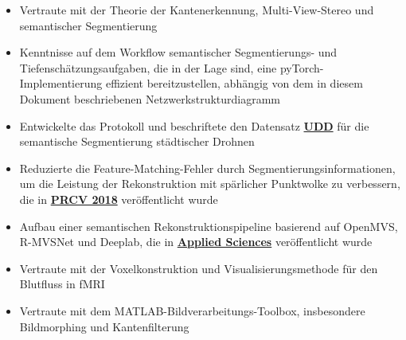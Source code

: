 \documentclass{resume}
\begin{document}
\begin{itemize}
    \item Vertraute mit der Theorie der Kantenerkennung, Multi-View-Stereo und semantischer Segmentierung
    \item Kenntnisse auf dem Workflow semantischer Segmentierungs- und Tiefenschätzungsaufgaben, die in der Lage sind, eine pyTorch-Implementierung effizient bereitzustellen, abhängig von dem in diesem Dokument beschriebenen Netzwerkstrukturdiagramm
	\item Entwickelte das Protokoll und beschriftete den Datensatz \href{https://mrright.wang/UDD/}{\textbf{UDD}} für die semantische Segmentierung städtischer Drohnen
	\item Reduzierte die Feature-Matching-Fehler durch Segmentierungsinformationen, um die Leistung der Rekonstruktion mit spärlicher Punktwolke zu verbessern, die in \href{https://link.springer.com/content/pdf/10.1007\%2F978-3-030-03398-9_30.pdf}{\textbf{PRCV 2018}} veröffentlicht wurde
    \item Aufbau einer semantischen Rekonstruktionspipeline basierend auf OpenMVS, R-MVSNet und Deeplab, die in \href{https://www.mdpi.com/2076-3417/10/4/1275/pdf}{\textbf{Applied Sciences}} veröffentlicht wurde

\end{itemize}


\begin{itemize}
  \item Vertraute mit der Voxelkonstruktion und Visualisierungsmethode für den Blutfluss in fMRI
  \item Vertraute mit dem MATLAB-Bildverarbeitungs-Toolbox, insbesondere Bildmorphing und Kantenfilterung
\end{itemize}


\end{document}
